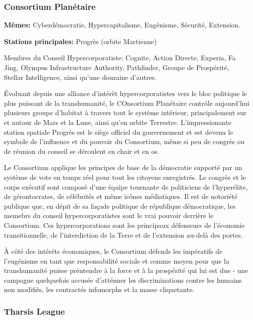 \subsubsection{Consortium Planétaire} \label{sec:planetary-consortium} 

\textbf{Mêmes:} Cyberdémocratie, Hypercapitalisme, Eugénisme, Sécurité, Extension. 

\textbf{Stations principales:} Progrès (orbite Martienne) 

Membres du Conseil Hypercorporatiste: Cognite, Action Directe, Experia, Fa Jing, Olympus Infrastructure Authority, Pathfinder, Groupe de Prospérité, Stellar Intelligence, ainsi qu'une douzaine d'autres. 

Évoluant depuis une alliance d'intérêt hypercorporatistes vers le bloc politique le plus puissant de la transhumanité, le COnsortium Planétaire contrôle aujourd'hui plusieurs groupe d'habitat à travers tout le système intérieur, principalement sur et autour de Mars et la Lune, ainsi qu'en orbite Terrestre. L'impressionante station spatiale Progrès est le siège officiel du gouvernement et est devenu le symbole de l'influence et du pouvoir du Consortium, même si peu de congrès ou de réunion du conseil se déroulent en chair et en os. 

Le Consortium applique les principes de base de la démocratie supporté par un système de vote en temps réel pour tout les citoyens enregistrés. Le congrès et le corps exécutif sont composé d'une équipe tournante de politiciens de l'hyperélite, de gérontocrates, de célébrités et même icônes médiatiques. Il est de notoriété publique que, en dépit de sa façade politique de république démocratique, les memebrs du conseil hypercorporatistes sont le vrai pouvoir derrière le Consortium. Ces hypercorporations sont les principaux défenseurs de l'économie transitionnelle, de l'interdiction de la Terre et de l'extension au-delà des portes. 

À côté des intérêts économiques, le Consortium défends les impératifs de l'eugénisme en tant que responsabilité sociale et comme moyen pour que la transhumanité puisse préntendre à la force et à la prospérité qui lui est due - une campagne quelquefois accusée d'atténuer les discriminations contre les humains non modifiés, les contractés infomorphs et la masse cliquetante. 

\subsubsection{Tharsis League} \label{sec:tharsis-league} 

